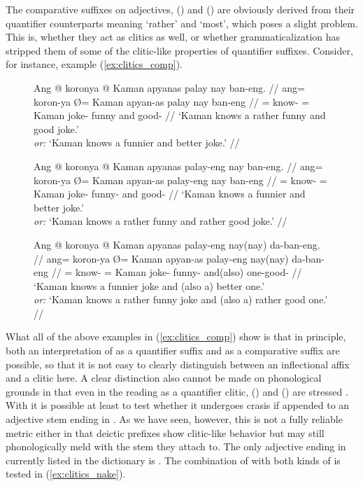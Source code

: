 The comparative suffixes on adjectives,  (\Comp{}) and
 (\Supl{}) are obviously derived from their quantifier
counterparts meaning `rather' and `most', which poses a slight problem. This
is, whether they act as clitics as well, or whether grammaticalization has
stripped them of some of the clitic-like properties of quantifier suffixes.
Consider, for instance, example (\ref{ex:clitics_comp}).

\begin{figure}[h]
\pex\label{ex:clitics_comp}
\a\label{ex:clitics_comp1}\begingl
	\gla Ang @ koronya {} @ Kaman apyanas palay nay ban-eng. //
	\glb ang= koron-ya Ø= Kaman apyan-as palay nay ban-eng //
	\glc \AgtT{}= know-\TsgM{} \Top{}= Kaman joke-\Parg{} funny and
		good-\Comp{} //
	\glft `Kaman knows a rather funny and good joke.' \\
		\textit{or:} `Kaman knows a funnier and better joke.' //
\endgl

\a\label{ex:clitics_comp2}\begingl
	\gla Ang @ koronya {} @ Kaman apyanas palay-eng nay ban-eng. //
	\glb ang= koron-ya Ø= Kaman apyan-as palay-eng nay ban-eng //
	\glc \AgtT{}= know-\TsgM{} \Top{}= Kaman joke-\Parg{} funny-\Comp{} and
		good-\Comp{} //
	\glft `Kaman knows a funnier and better joke.' \\
		\textit{or:} `Kaman knows a rather funny and rather good joke.' //
\endgl

\a\label{ex:clitics_comp3}\begingl
	\gla Ang @ koronya {} @ Kaman apyanas palay-eng nay(nay) da-ban-eng. //
	\glb ang= koron-ya Ø= Kaman apyan-as palay-eng nay(nay) da-ban-eng //
	\glc \AgtT{}= know-\TsgM{} \Top{}= Kaman joke-\Parg{} funny-\Comp{}
		and(\til{}also) one-good-\Comp{} //
	\glft `Kaman knows a funnier joke and (also a) better one.' \\
		\textit{or:} `Kaman knows a rather funny joke and (also a) rather good 
		one.' //
\endgl
\xe
\end{figure}

What all of the above examples in (\ref{ex:clitics_comp}) show is that in
principle, both an interpretation of  as a quantifier suffix
and as a comparative suffix are possible, so that it is not easy to clearly
distinguish between an inflectional affix and a clitic here. A clear
distinction also cannot be made on phonological grounds in that even in the
reading as a quantifier clitic,  (\Comp{}) and
 (\Supl{}) are stressed 
\parencite[compare][90--92]{spencerluis2012}. With  it is
possible at least to test whether it undergoes crasis if appended to an
adjective stem ending in . As we have seen, however, this is not a
fully reliable metric either in that deictic prefixes show clitic-like behavior
but may still phonologically meld with the stem they attach to. The only
adjective ending in  currently listed in the dictionary is 
. The combination of  with both
kinds of  is tested in (\ref{ex:clitics_nake}).

